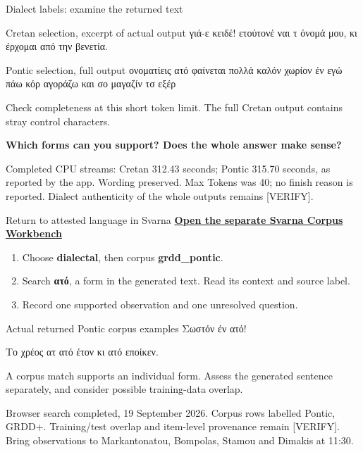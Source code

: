 \documentclass[aspectratio=169,10pt]{beamer}
\newcommand{\key}[1]{\textcolor{aegean}{\textbf{#1}}}
\newcommand{\source}[1]{\vfill{\scriptsize\color{slate}#1\par}}
\newcommand{\question}[1]{\medskip\par\key{#1}\par}
\begin{document}
\begin{frame}{Dialect labels: examine the returned text}
  \small
  \begin{block}{Cretan selection, excerpt of actual output}
    \large γιά-ε κειδέ! ετούτονέ ναι τ όνομά μου, κι έρχομαι από την βενετία.
  \end{block}
  \begin{block}{Pontic selection, full output}
    \large ονοματίεις ατό φαίνεται πολλά καλόν χωρίον έν εγώ πάω κόρ αγοράζω και σο μαγαζίν τσ εξέρ
  \end{block}
  Check completeness at this short token limit. The full Cretan output contains stray control characters.
  \question{Which forms can you support? Does the whole answer make sense?}
  \source{Completed CPU streams: Cretan 312.43 seconds; Pontic 315.70 seconds, as reported by the app.\newline
  Wording preserved. Max Tokens was 40; no finish reason is reported. Dialect authenticity of the whole outputs remains [VERIFY].}
\end{frame}

\begin{frame}{Return to attested language in Svarna}
  \small
  \href{https://greek-corpus-workbench.wonderfulhill-e1c9f1a0.westeurope.azurecontainerapps.io}{\key{Open the separate Svarna Corpus Workbench}}
  \begin{enumerate}
    \item Choose \textbf{dialectal}, then corpus \textbf{grdd\_pontic}.
    \item Search \textbf{ατό}, a form in the generated text. Read its context and source label.
    \item Record one supported observation and one unresolved question.
  \end{enumerate}
  \begin{block}{Actual returned Pontic corpus examples}
    \large Σωστόν έν ατό!\par
    Το χρέος ατ ατό έτον κι ατό εποίκεν.
  \end{block}
  \small A corpus match supports an individual form. Assess the generated sentence separately, and consider possible training-data overlap.
  \source{Browser search completed, 19 September 2026. Corpus rows labelled Pontic, GRDD+. Training/test overlap and item-level provenance remain [VERIFY].\newline
  Bring observations to Markantonatou, Bompolas, Stamou and Dimakis at 11:30.}
\end{frame}
\end{document}
